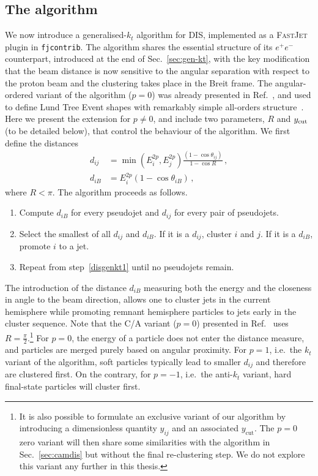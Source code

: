\subsection{The algorithm}
We now introduce a generalised-$k_t$ algorithm for DIS, implemented as  a \textsc{FastJet} plugin in \texttt{fjcontrib}.
%
The algorithm shares the essential structure of its $e^+e^-$
counterpart, introduced at the end of Sec.~\ref{sec:gen-kt}, with the
key modification that the beam distance is now sensitive to the
angular separation with respect to the proton beam and the clustering
takes place in the Breit frame.
%
The angular-ordered variant of the algorithm ($p=0$) was already presented in Ref.~\cite{vanBeekveld:2023chs}, and used to define Lund Tree Event shapes with remarkably simple all-orders structure~\cite{vanBeekveld:2025zjh}.
%
Here we present the extension for $p\neq 0$, and include two parameters, $R$ and $y_{\rm cut}$ (to be detailed below), that control the behaviour of the algorithm. 
%
We first define the distances
\begin{subequations}
\label{eq:dij-diB-ouralg}
\begin{align}
	d_{ij}& = \min(E_{i}^{2p},E_{j}^{2p}) \frac{(1-\cos\theta_{ij})}{1-\cos R} \,,  \\
	d_{iB} &= E_{i}^{2p}(1-\cos\theta_{iB})\,, 
\end{align}
\end{subequations}
%
where $R < \pi$. 
%
The algorithm proceeds as follows.
\begin{enumerate}
	\item \label{disgenkt1} Compute $d_{iB}$ for every pseudojet and $d_{ij}$ for every pair of pseudojets.
	\item Select the smallest of all $d_{ij}$ and $d_{iB}$. If it is a $d_{ij}$, cluster $i$ and $j$. If it is a $d_{iB}$, promote $i$ to a jet.
	\item Repeat from step~\ref{disgenkt1} until no pseudojets remain. 
\end{enumerate}
The introduction of the distance $d_{iB}$ measuring both the energy
and the closeness in angle to the beam direction, allows one to
cluster jets in the current hemisphere while promoting remnant
hemisphere particles to jets early in the cluster sequence.
%
Note that the C/A variant ($p=0$) presented in
Ref.~\cite{vanBeekveld:2023chs} uses $R=\frac{\pi}{2}$.\footnote{It is also
possible to formulate an exclusive variant of our algorithm by
introducing a dimensionless quantity $y_{ij}$ and an associated
$y_{\mathrm{cut}}$. The $p=0$ zero variant will then share some
similarities with the algorithm in Sec.~\ref{sec:camdis} but without the
final re-clustering step. We do not explore this variant any further
in this thesis. }
%
For $p=0$, the energy of a particle does not enter the distance measure, and particles are merged purely based on angular proximity. 
%
For $p=1$, i.e.\ the $k_t$ variant of the algorithm, soft particles typically lead to smaller $d_{ij}$ and therefore are clustered first.
%
On the contrary, for $p = -1$, i.e.\ the anti-$k_t$ variant, hard final-state particles will cluster first. 


